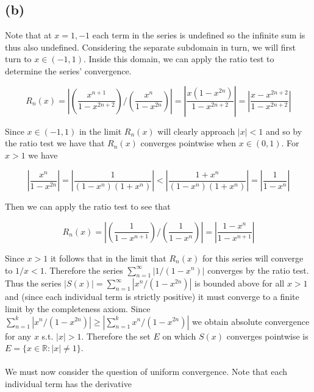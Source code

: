 \documentclass{article}
\begin{document}
\subsection*{(b)}
Note that at $x = 1,-1$ each term in the series is undefined so the infinite sum is thus also 
undefined. Considering the separate subdomain in turn, we will first turn to $x \in (-1,1)$. 
Inside this domain, we can apply the ratio test to determine the series' convergence.

\begin{equation*}
	R_n(x) = \left|\left(\frac{x^{n+1}}{1-x^{2n+2}}\right)/\left(\frac{x^n}{1-x^{2n}}\right)\right| = \left|\frac{x(1-x^{2n})}{1-x^{2n+2}}\right| = \left|\frac{x-x^{2n+2}}{1-x^{2n+2}}\right|
\end{equation*}

Since $x \in (-1,1)$ in the limit $R_n(x)$ will clearly approach $|x| < 1$ and so by the ratio test we 
have that $R_n(x)$ converges pointwise when $x \in (0,1)$. For $x > 1$ we have 

\begin{equation*}
	\left|\frac{x^n}{1-x^{2n}}\right| = \left|\frac{1}{(1-x^n)(1+x^n)}\right| < \left|\frac{1+x^n}{(1-x^n)(1+x^n)}\right| = \left|\frac{1}{1-x^n}\right|
\end{equation*}

Then we can apply the ratio test to see that 

\begin{equation*}
	R_n(x) = \left|\left(\frac{1}{1 - x^{n+1}}\right)/\left(\frac{1}{1 - x^{n}}\right)\right| = \left|\frac{1 - x^n}{1 - x^{n+1}}\right|
\end{equation*}

Since $x > 1$ it follows that in the limit that $R_n(x)$ for this series will converge to $1/x < 1$. 
Therefore the series $\sum_{n=1}^{\infty}|1/(1-x^n)|$ converges by the ratio test.
Thus the series $|S(x)| = \sum_{n=1}^{\infty}|x^n/(1-x^{2n})|$ is bounded above for all $x > 1$ and 
(since each individual term is strictly positive) it must converge to a finite limit by the 
completeness axiom. Since $\sum_{n=1}^{k}|x^n/(1-x^{2n})| \geq \left|\sum_{n=1}^{k}x^n/(1-x^{2n})\right|$ 
we obtain absolute convergence for any $x$ s.t. $|x| > 1$. Therefore the set $E$ on which 
$S(x)$ converges pointwise is $E = \{x \in \mathbb{R}:|x| \neq 1\}$.

\paragraph{}
We must now consider the question of uniform convergence. 
Note that each individual term has the derivative 
\end{document}
